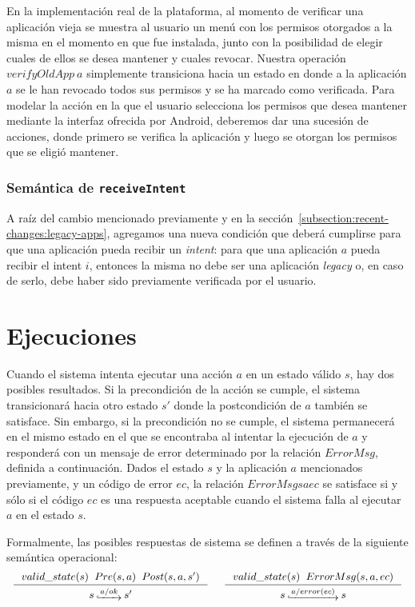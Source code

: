 En la implementación real de la plataforma, al momento de verificar una aplicación vieja se muestra al
usuario un menú con los permisos otorgados a la misma en el momento en que fue instalada, junto
con la posibilidad de elegir cuales de ellos se desea mantener y cuales revocar. Nuestra operación
$verifyOldApp\ a$ simplemente transiciona hacia un estado en donde a la aplicación $a$ se le han
revocado todos sus permisos y se ha marcado como verificada. Para modelar la acción en la que el
usuario selecciona los permisos que desea mantener mediante la interfaz ofrecida por Android,
deberemos dar una sucesión de acciones,  donde primero se verifica la aplicación y luego se otorgan
los permisos que se eligió mantener.

\subsubsection{Semántica de \texttt{receiveIntent}}

A raíz del cambio mencionado previamente y en la sección~\ref{subsection:recent-changes:legacy-apps},
agregamos una nueva condición que deberá cumplirse para que una aplicación pueda recibir un
\textit{intent}: para que una aplicación $a$ pueda recibir el intent $i$, entonces la misma no debe
ser una aplicación \textit{legacy} o, en caso de serlo, debe haber sido previamente verificada por el
usuario.



\section{Ejecuciones}
Cuando el sistema intenta ejecutar una acción $a$ en un estado válido $s$, hay dos posibles
resultados. Si la precondición de la acción se cumple, el sistema transicionará hacia otro estado $s'$
donde la postcondición de $a$ también se satisface. Sin embargo, si la precondición no se cumple, el
sistema permanecerá en el mismo estado en el que se encontraba al intentar la ejecución de $a$ y
responderá con un mensaje de error determinado por la relación $ErrorMsg$, definida a continuación.
Dados el estado $s$ y la aplicación $a$ mencionados previamente, y un código de error $ec$, la
relación $ErrorMsg s a ec$ se satisface si y sólo si el código $ec$ es una respuesta aceptable cuando
el sistema falla al ejecutar $a$ en el estado $s$.

Formalmente, las posibles respuestas de sistema se definen a través de la siguiente semántica operacional:
\begin{displaymath}
    \begin{array}{c}
        \inference[]{$$valid\_state(s)$$ \hspace{.2cm} $$Pre(s, a)$$ \hspace{.2cm} $$Post(s, a, s')$$}{$$s\step{a/ok}s'$$}
        \hspace{0.5cm}
        \inference[]{$$valid\_state(s)$$ \hspace{.2cm} $$ErrorMsg(s, a, ec)$$}{$$s\step{a/error(ec)}s$$}
    \end{array}
\end{displaymath}

